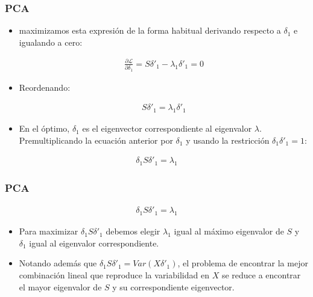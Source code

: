 \documentclass[
  shownotes,
  xcolor={svgnames},
  hyperref={colorlinks,citecolor=DarkBlue,linkcolor=DarkRed,urlcolor=DarkBlue}
  , aspectratio=169]{beamer}
\begin{document}
\begin{frame}
\frametitle{PCA}

\begin{itemize}

  \item maximizamos esta expresión de la forma habitual derivando respecto a \(\delta_1\) e igualando a cero:

\begin{align}
\frac{\partial \mathcal{L}}{\partial \delta_1}=S \delta'_1 - \lambda_1 \delta'_1 =0
\end{align}

\item Reordenando:

\begin{align}
S \delta'_1 = \lambda_1 \delta'_1
\end{align}

\item En el óptimo, \(\delta_1\) es el eigenvector correspondiente al eigenvalor \(\lambda\). Premultiplicando la ecuación anterior por
\(\delta_1\) y usando la restricción \(\delta_1\delta'_1=1\):
\end{itemize}


\begin{align}
\delta_1 S \delta'_1 = \lambda_1 
\end{align}

\end{frame}
\begin{frame}
\frametitle{PCA}

\begin{align}
\delta_1 S \delta'_1 = \lambda_1 
\end{align}

\begin{itemize}

\medskip
\item Para maximizar \(\delta_1 S \delta'_1\) debemos elegir \(\lambda_1\) igual al máximo eigenvalor de \(S\) y \(\delta_1\) igual al eigenvalor
correspondiente. 
\medskip
\item  Notando además que \(\delta_1 S \delta'_1=Var(X \delta'_1)\), el problema de encontrar la mejor combinación lineal que reproduce la variabilidad en \(X\) se reduce a encontrar el mayor eigenvalor de \(S\) y su correspondiente eigenvector.

\end{itemize}


\end{frame}
\end{document}
